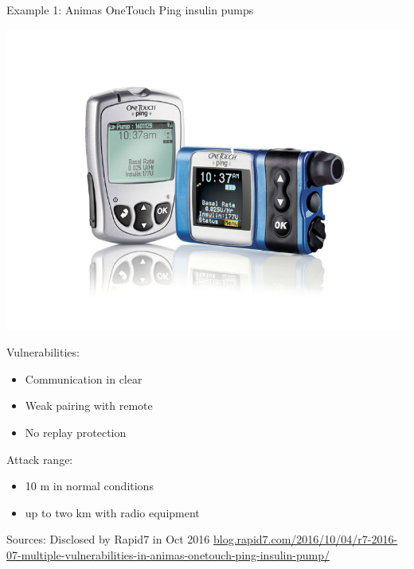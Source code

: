 \begin{frame}{Example 1: Animas OneTouch Ping insulin pumps}
    \begin{center}
        \includegraphics[scale=0.2, trim={0 3cm 0 3cm}, clip]{Figures/insuline_pump.jpg}
    \end{center}
    \vspace{-5mm}
    
    Vulnerabilities:
    \begin{itemize}
        \item Communication in clear
        \item Weak pairing with remote
        \item No replay protection
    \end{itemize}
    
    Attack range:
    \begin{itemize}
        \item 10 m in normal conditions
        \item up to two km with radio equipment
    \end{itemize}
    
    \medskip
    \tiny{Sources: Disclosed by Rapid7 in Oct 2016 \url{blog.rapid7.com/2016/10/04/r7-2016-07-multiple-vulnerabilities-in-animas-onetouch-ping-insulin-pump/}}
\end{frame}


